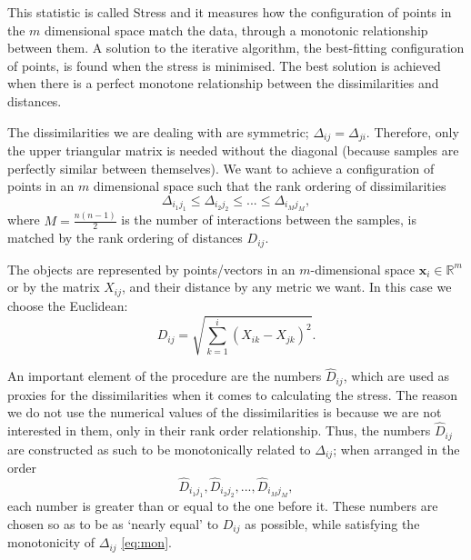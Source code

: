 This statistic is called Stress and it measures how the configuration of points in the $m$ dimensional space match the data, through a monotonic relationship between them. A solution to the iterative algorithm, the best-fitting configuration of points, is found when the stress is minimised. The best solution is achieved when there is a perfect monotone relationship between the dissimilarities and distances. 

The dissimilarities we are dealing with are symmetric; $\Delta_{ij} =\Delta_{ji}$. Therefore, only the upper triangular matrix is needed without the diagonal (because samples are perfectly similar between themselves). We want to achieve a configuration of points in an $m$ dimensional space such that the rank ordering of dissimilarities
\begin{equation}
	\Delta_{i_1 j_1} \leq 	\Delta_{i_2 j_2} \leq ... \leq 	\Delta_{i_M j_M},
	\label{eq:mon}
\end{equation}
where $M = \frac{n(n-1)}{2}$ is the number of interactions between the samples, is matched by the rank ordering of distances $D_{ij}$.

The objects are represented by points/vectors in an $m$-dimensional space ${ \mathbf x}_i \in \mathbb{R}^m$ or by the matrix $X_{ij}$, and their distance by any metric we want. In this case we choose the Euclidean:
\begin{equation}
	D_{i j}=\sqrt{\sum_{k=1}^{i}\left(X_{i k}-X_{j k}\right)^{2}}.
\end{equation}


An important element of the procedure are the numbers $\hat{D}_{ij}$, which are used as proxies for the dissimilarities when it comes to calculating the stress. The reason we do not use the numerical values of the dissimilarities is because we are not interested in them, only in their rank order relationship. Thus, the numbers $\hat{D}_{ij}$ are constructed as such to be monotonically related to $\Delta_{ij}$; when arranged in the order
\begin{equation}
	\hat{D}_{i_1 j_1},	\hat{D}_{i_2 j_2}, ...,	\hat{D}_{i_M j_M},
\end{equation}
each number is greater than or equal to the one before it. 
These numbers are chosen so as to be as `nearly equal' to $D_{ij}$ as possible, while satisfying the monotonicity of $\Delta_{ij}$ \eqref{eq:mon}. 


